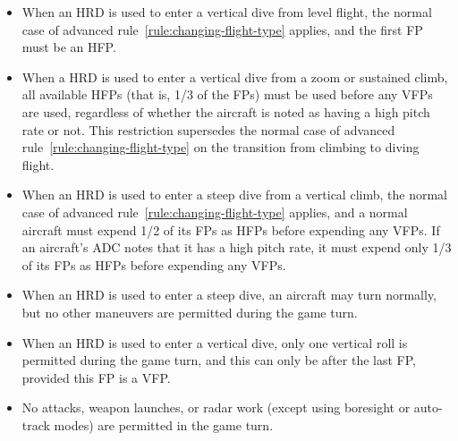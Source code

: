 {\begin{itemize}

    \item When an HRD is used to enter a vertical dive from level flight, the normal case of advanced rule~\ref{rule:changing-flight-type} applies, and the first FP must be an HFP.

    \item When a HRD is used to enter a vertical dive from a zoom or sustained climb, all available HFPs (that is, 1/3 of the FPs) must be used before any VFPs are used, regardless of whether the aircraft is noted as having a high pitch rate or not. This restriction supersedes the normal case of advanced rule~\ref{rule:changing-flight-type} on the transition from climbing to diving flight.
    
    \item When an HRD is used to enter a steep dive from a vertical climb, the normal case of advanced rule~\ref{rule:changing-flight-type} applies, and a normal aircraft must expend 1/2 of its FPs as HFPs before expending any VFPs. If an aircraft's ADC notes that it has a high pitch rate, it must expend only 1/3 of its FPs as HFPs before expending any VFPs.
    
    \item When an HRD is used to enter a steep dive, an aircraft may turn normally, but no other maneuvers are permitted during the game turn.

    \item When an HRD is used to enter a vertical dive, only one vertical roll is permitted during the game turn, and this can only be after the last FP, provided this FP is a VFP.

    \item No attacks, weapon launches, or radar work (except using boresight or auto-track modes) are permitted in the game turn.
    
\end{itemize}

}
\label{rule:sustained-rolling-maneuvers}

